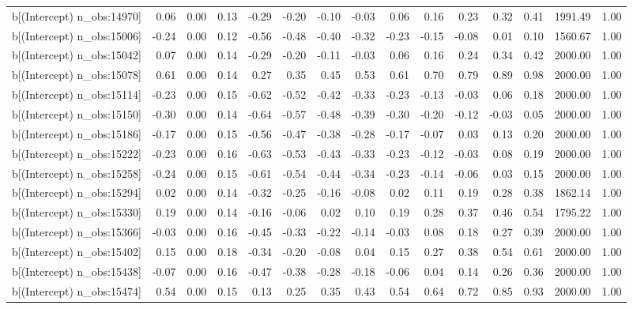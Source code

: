 \begin{table}[ht]
\begin{tabular}{rrrrrrrrrrrrrrr}
  b[(Intercept) n\_obs:14970] & 0.06 & 0.00 & 0.13 & -0.29 & -0.20 & -0.10 & -0.03 & 0.06 & 0.16 & 0.23 & 0.32 & 0.41 & 1991.49 & 1.00 \\ 
  b[(Intercept) n\_obs:15006] & -0.24 & 0.00 & 0.12 & -0.56 & -0.48 & -0.40 & -0.32 & -0.23 & -0.15 & -0.08 & 0.01 & 0.10 & 1560.67 & 1.00 \\ 
  b[(Intercept) n\_obs:15042] & 0.07 & 0.00 & 0.14 & -0.29 & -0.20 & -0.11 & -0.03 & 0.06 & 0.16 & 0.24 & 0.34 & 0.42 & 2000.00 & 1.00 \\ 
  b[(Intercept) n\_obs:15078] & 0.61 & 0.00 & 0.14 & 0.27 & 0.35 & 0.45 & 0.53 & 0.61 & 0.70 & 0.79 & 0.89 & 0.98 & 2000.00 & 1.00 \\ 
  b[(Intercept) n\_obs:15114] & -0.23 & 0.00 & 0.15 & -0.62 & -0.52 & -0.42 & -0.33 & -0.23 & -0.13 & -0.03 & 0.06 & 0.18 & 2000.00 & 1.00 \\ 
  b[(Intercept) n\_obs:15150] & -0.30 & 0.00 & 0.14 & -0.64 & -0.57 & -0.48 & -0.39 & -0.30 & -0.20 & -0.12 & -0.03 & 0.05 & 2000.00 & 1.00 \\ 
  b[(Intercept) n\_obs:15186] & -0.17 & 0.00 & 0.15 & -0.56 & -0.47 & -0.38 & -0.28 & -0.17 & -0.07 & 0.03 & 0.13 & 0.20 & 2000.00 & 1.00 \\ 
  b[(Intercept) n\_obs:15222] & -0.23 & 0.00 & 0.16 & -0.63 & -0.53 & -0.43 & -0.33 & -0.23 & -0.12 & -0.03 & 0.08 & 0.19 & 2000.00 & 1.00 \\ 
  b[(Intercept) n\_obs:15258] & -0.24 & 0.00 & 0.15 & -0.61 & -0.54 & -0.44 & -0.34 & -0.23 & -0.14 & -0.06 & 0.03 & 0.15 & 2000.00 & 1.00 \\ 
  b[(Intercept) n\_obs:15294] & 0.02 & 0.00 & 0.14 & -0.32 & -0.25 & -0.16 & -0.08 & 0.02 & 0.11 & 0.19 & 0.28 & 0.38 & 1862.14 & 1.00 \\ 
  b[(Intercept) n\_obs:15330] & 0.19 & 0.00 & 0.14 & -0.16 & -0.06 & 0.02 & 0.10 & 0.19 & 0.28 & 0.37 & 0.46 & 0.54 & 1795.22 & 1.00 \\ 
  b[(Intercept) n\_obs:15366] & -0.03 & 0.00 & 0.16 & -0.45 & -0.33 & -0.22 & -0.14 & -0.03 & 0.08 & 0.18 & 0.27 & 0.39 & 2000.00 & 1.00 \\ 
  b[(Intercept) n\_obs:15402] & 0.15 & 0.00 & 0.18 & -0.34 & -0.20 & -0.08 & 0.04 & 0.15 & 0.27 & 0.38 & 0.54 & 0.61 & 2000.00 & 1.00 \\ 
  b[(Intercept) n\_obs:15438] & -0.07 & 0.00 & 0.16 & -0.47 & -0.38 & -0.28 & -0.18 & -0.06 & 0.04 & 0.14 & 0.26 & 0.36 & 2000.00 & 1.00 \\ 
  b[(Intercept) n\_obs:15474] & 0.54 & 0.00 & 0.15 & 0.13 & 0.25 & 0.35 & 0.43 & 0.54 & 0.64 & 0.72 & 0.85 & 0.93 & 2000.00 & 1.00 \\ 

\end{tabular}
\end{table}
